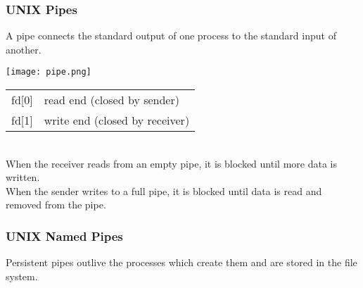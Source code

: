 \documentclass{report}
\begin{document}
        \subsubsection*{UNIX Pipes}
            A pipe connects the standard output of one process to the standard input of another.
            \begin{center}
                \texttt{[image: pipe.png]}
            \end{center}
            
            \begin{tabular}{r l}
                fd[0] & read end (closed by sender) \\
                fd[1] & write end (closed by receiver) \\
            \end{tabular}
            \\ When the receiver reads from an empty pipe, it is blocked until more data is written.
            \\ When the sender writes to a full pipe, it is blocked until data is read and removed from the pipe.
            

        \subsubsection*{UNIX Named Pipes}
            Persistent pipes outlive the processes which create them and are stored in the file system.
            
\end{document}
